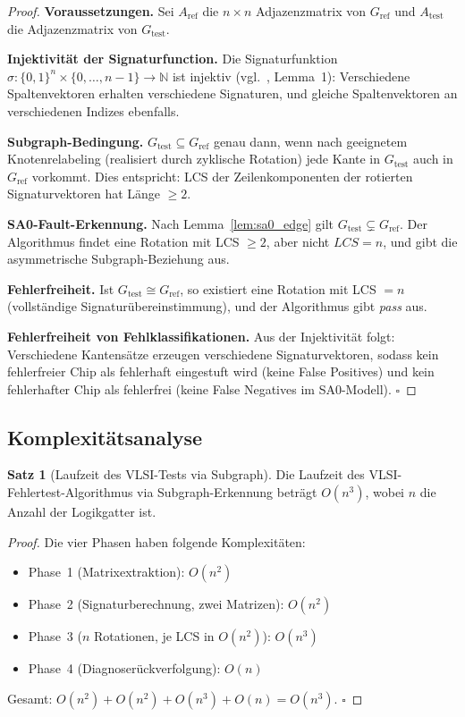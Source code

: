 ﻿\documentclass[a4paper,12pt]{article}
\theoremstyle{definition}
\newtheorem{satz}{Satz}
\begin{document}
\begin{proof}
  \textbf{Voraussetzungen.}
  Sei $A_{\mathrm{ref}}$ die $n \times n$ Adjazenzmatrix von
  $G_{\mathrm{ref}}$ und $A_{\mathrm{test}}$ die Adjazenzmatrix von
  $G_{\mathrm{test}}$.

  \textbf{Injektivität der Signaturfunction.}
  Die Signatur\-funktion
  $\sigma: \{0,1\}^n \times \{0,\ldots,n-1\} \to \mathbb{N}$ ist
  injektiv (vgl.~\cite{epp2026subgraph}, Lemma~1): Verschiedene
  Spaltenvektoren erhalten verschiedene Signaturen, und gleiche
  Spaltenvektoren an verschiedenen Indizes ebenfalls.

  \textbf{Subgraph-Bedingung.}
  $G_{\mathrm{test}} \subseteq G_{\mathrm{ref}}$ genau dann, wenn
  nach geeignetem Knotenrelabeling (realisiert durch zyklische Rotation)
  jede Kante in $G_{\mathrm{test}}$ auch in $G_{\mathrm{ref}}$
  vorkommt. Dies entspricht: LCS der Zeilenkomponenten der rotierten
  Signaturvektoren hat Länge $\geq 2$.

  \textbf{SA0-Fault-Erkennung.}
  Nach Lemma~\ref{lem:sa0_edge} gilt
  $G_{\mathrm{test}} \subsetneq G_{\mathrm{ref}}$.
  Der Algorithmus findet eine Rotation mit LCS $\geq 2$, aber nicht
  $LCS = n$, und gibt die asymmetrische Subgraph-Beziehung aus.

  \textbf{Fehlerfreiheit.}
  Ist $G_{\mathrm{test}} \cong G_{\mathrm{ref}}$, so existiert eine
  Rotation mit LCS $= n$ (vollständige Signaturübereinstimmung), und
  der Algorithmus gibt \emph{pass} aus.

  \textbf{Fehlerfreiheit von Fehlklassifikationen.}
  Aus der Injektivität folgt: Verschiedene Kantensätze erzeugen
  verschiedene Signaturvektoren, sodass kein fehlerfreier Chip als
  fehlerhaft eingestuft wird (keine False Positives) und kein
  fehlerhafter Chip als fehlerfrei (keine False Negatives im
  SA0-Modell). $\square$
\end{proof}

\subsection{Komplexitätsanalyse}

\begin{satz}[Laufzeit des VLSI-Tests via Subgraph]
  \label{satz:laufzeit}
  Die Laufzeit des VLSI-Fehlertest-Algorithmus via Subgraph-Erkennung
  beträgt $O(n^3)$, wobei $n$ die Anzahl der Logikgatter ist.
\end{satz}

\begin{proof}
  Die vier Phasen haben folgende Komplexitäten:
  \begin{itemize}
    \item Phase~1 (Matrixextraktion): $O(n^2)$
    \item Phase~2 (Signaturberechnung, zwei Matrizen): $O(n^2)$
    \item Phase~3 ($n$ Rotationen, je LCS in $O(n^2)$): $O(n^3)$
    \item Phase~4 (Diagnoserückverfolgung): $O(n)$
  \end{itemize}
  Gesamt: $O(n^2) + O(n^2) + O(n^3) + O(n) = O(n^3)$. $\square$
\end{proof}
\end{document}
